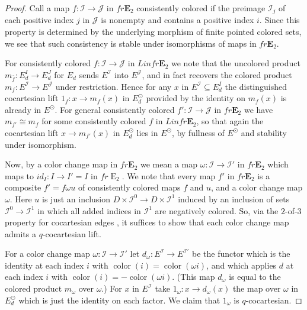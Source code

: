 \documentclass[reqno]{amsart}
\theoremstyle{definition}
\newcommand{\mcl}[1]{\mathcal{#1}}
\newcommand{\opn}[1]{\operatorname{#1}}
\newcommand{\E}{\mathbf{E}}
\renewcommand{\1}{\mathbf{1}}
\begin{document}
\begin{proof}
Call a map $f:\mcl{I}\to \mcl{J}$ in $fr\E_2$ consistently colored if the preimage $\mcl{I}_j$ of each positive index $j$ in $\mcl{J}$ is nonempty and contains a positive index $i$. Since this property is determined by the underlying morphism of finite pointed colored sets, we see that such consistency is stable under isomorphisms of maps in $fr\E_2$.
\par 

For consistently colored $f:\mcl{I}\to \mcl{J}$ in $Linfr\E_2$ we note that the uncolored product $m_{\bar{f}}:E_d^I\to E_d^J$ for $E_d$ sends $E^{\mcl{I}}$ into $E^{\mcl{J}}$, and in fact recovers the colored product $m_f:E^{\mcl{I}}\to E^{\mcl{J}}$ under restriction.  Hence for any $x$ in $E^{\mcl{I}}\subseteq E^I_d$ the distinguished cocartesian lift $1_{f}:x\to m_f(x)$ in $E_d^{\odot}$ provided by the identity on $m_f(x)$ is already in $E^{\odot}$.  For general consistently colored $f':\mcl{I}\to \mcl{J}$ in $fr\E_2$ we have $m_{f'}\cong m_f$ for some consistently colored $f$ in $Linfr\E_2$, so that again the cocartesian lift $x\to m_{f'}(x)$ in $E_d^{\odot}$ lies in $E^{\odot}$, by fullness of $E^{\odot}$ and stability under isomorphism.
\par

Now, by a color change map in $fr\E_2$ we mean a map $\omega:\mcl{I}\to \mcl{I}'$ in $fr\E_2$ which maps to $id_I:I\to I'=I$ in $fr\opn{E}_2$.  We note that every map $f'$ in $fr\E_2$ is a composite $f'=f\omega u$ of consistently colored maps $f$ and $u$, and a color change map $\omega$.  Here $u$ is just an inclusion $D\times \mcl{I}^0\to D\times \mcl{I}^1$ induced by an inclusion of sets $\mcl{I}^0\to \mcl{I}^1$ in which all added indices in $\mcl{I}^1$ are negatively colored. So, via the $2$-of-$3$ property for cocartesian edges \cite[\href{https://kerodon.net/tag/01TS}{01TS}]{kerodon}, it suffices to show that each color change map admits a $q$-cocartesian lift.
\par

For a color change map $\omega:\mcl{I}\to\mcl{I}'$ let $d_{\omega}:E^{\mcl{I}}\to E^{\mcl{I}'}$ be the functor which is the identity at each index $i$ with $\opn{color}(i)=\opn{color}(\omega i)$, and which applies $d$ at each index $i$ with $\opn{color}(i)=-\opn{color}(\omega i)$. (This map $d_{\omega}$ is equal to the colored product $m_{\omega}$ over $\omega$.)  For $x$ in $E^{\mcl{I}}$ take $1_{\omega}:x\to d_{\omega}(x)$ the map over $\omega$ in $E_d^{\odot}$ which is just the identity on each factor.  We claim that $1_{\omega}$ is $q$-cocartesian.
\par


\end{proof}
\end{document}
